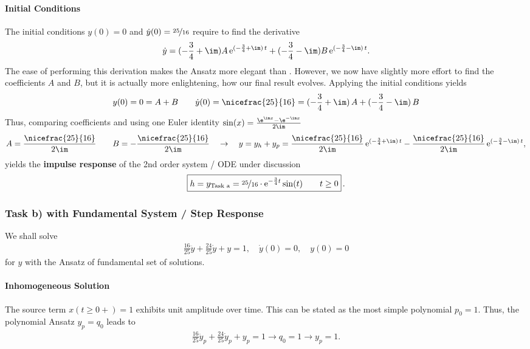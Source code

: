 \paragraph{Initial Conditions}
\label{Sec:TaskaInitCond}
The initial conditions $y(0)=0$ and $\dot{y}(0)=\nicefrac{25}{16}$ require to find
the derivative
\begin{align}
\dot{y} =
(-\frac{3}{4}+\im) A \, \mathrm{e}^{(-\frac{3}{4}+\im)\,t} +
(-\frac{3}{4}-\im) B \, \mathrm{e}^{(-\frac{3}{4}-\im)\,t}.
\end{align}
%
The ease of performing this derivation makes the Ansatz 
more elegant than .
%
However, we now have slightly more effort to find the coefficients $A$ and $B$,
but it is actually more enlightening, how our final result evolves.
%
Applying the initial conditions yields
%
\begin{align}
y(0) = 0 = A + B
\qquad
\dot{y}(0) = \nicefrac{25}{16} =
(-\frac{3}{4}+\im) \, A + (-\frac{3}{4}-\im) \, B
\end{align}
Thus, comparing coefficients and using one Euler identity
$\sin(x) = \frac{\e^{\im x}-\e^{-\im x}}{2\im}$
\begin{align}
A = \frac{\nicefrac{25}{16}}{2\im}\qquad B = -\frac{\nicefrac{25}{16}}{2\im}
\quad\rightarrow\quad
y = y_h + y_p =
 \frac{\nicefrac{25}{16}}{2\im} \, \mathrm{e}^{(-\frac{3}{4}+\im)\,t}
-\frac{\nicefrac{25}{16}}{2\im} \, \mathrm{e}^{(-\frac{3}{4}-\im)\,t},
\end{align}
yields the \textbf{impulse response} of the 2nd order system / ODE under discussion
\begin{align}
\boxed{
h = y_\text{Task a} = \nicefrac{25}{16} \cdot \mathrm{e}^{-\frac{3}{4} t} \sin(t) \qquad t\geq0
}\,.
\end{align}



\subsubsection{Task b) with Fundamental System / Step Response}
We shall solve
\begin{align}
\frac{16}{25} \ddot{y} + \frac{24}{25} \dot{y} + y = 1, \quad
\dot{y}(0) = 0,\quad y(0)=0
\end{align}
for $y$ with the Ansatz of fundamental set of solutions.

\paragraph{Inhomogeneous Solution}
The source term $x(t\geq 0+)=1$ exhibits unit
amplitude over time. This can be stated as the most simple polynomial $p_0=1$.
Thus, the polynomial Ansatz $y_p = q_0$ leads to
\begin{align}
\frac{16}{25} \ddot{y}_p + \frac{24}{25} \dot{y}_p + y_p = 1
\rightarrow q_0 = 1 \rightarrow  y_p = 1.
\end{align}

